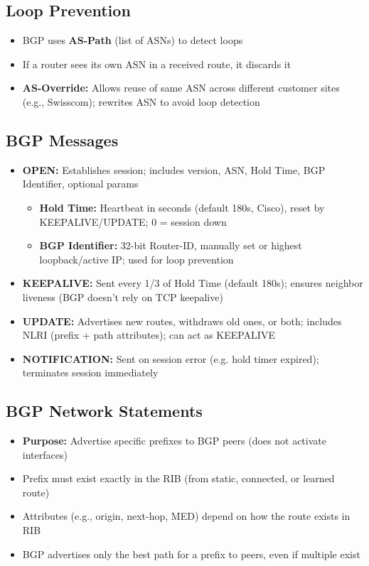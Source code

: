 \begin{multicols*}{5}
		\subsection{Loop Prevention}
		\begin{itemize}
			\item BGP uses \textbf{AS-Path} (list of ASNs) to detect loops
			\item If a router sees its own ASN in a received route, it discards it
			\item \textbf{AS-Override:} Allows reuse of same ASN across different customer sites (e.g., Swisscom); rewrites ASN to avoid loop detection
		\end{itemize}
		
		\subsection{BGP Messages}
		\begin{itemize}
			\item \textbf{OPEN:} Establishes session; includes version, ASN, Hold Time, BGP Identifier, optional params
			\begin{itemize}
				\item \textbf{Hold Time:} Heartbeat in seconds (default 180s, Cisco), reset by KEEPALIVE/UPDATE; 0 = session down
				\item \textbf{BGP Identifier:} 32-bit Router-ID, manually set or highest loopback/active IP; used for loop prevention
			\end{itemize}
			\item \textbf{KEEPALIVE:} Sent every 1/3 of Hold Time (default 180s); ensures neighbor liveness (BGP doesn’t rely on TCP keepalive)
			\item \textbf{UPDATE:} Advertises new routes, withdraws old ones, or both; includes NLRI (prefix + path attributes); can act as KEEPALIVE
			\item \textbf{NOTIFICATION:} Sent on session error (e.g. hold timer expired); terminates session immediately
		\end{itemize}
		
		\subsection{BGP Network Statements}
		\begin{itemize}
			\item \textbf{Purpose:} Advertise specific prefixes to BGP peers (does not activate interfaces)
			\item Prefix must exist exactly in the RIB (from static, connected, or learned route)
			\item Attributes (e.g., origin, next-hop, MED) depend on how the route exists in RIB
			\item BGP advertises only the best path for a prefix to peers, even if multiple exist
		\end{itemize}
		

\end{multicols*}
